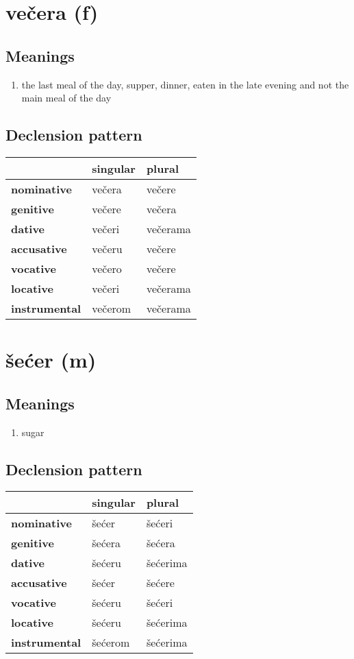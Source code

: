\filbreak
\section{večera (f)}
\subsection*{Meanings}
\begin{enumerate}
\item the last meal of the day, supper, dinner, eaten in the late evening and not the main meal of the day
\end{enumerate}
\subsection*{Declension pattern}
\begin{tabularx}{\linewidth}{Xll}
\toprule
{} & singular &    plural \\
\midrule
\textbf{nominative  } &   večera &    večere \\
\textbf{genitive    } &   večere &    večera \\
\textbf{dative      } &   večeri &  večerama \\
\textbf{accusative  } &   večeru &    večere \\
\textbf{vocative    } &   večero &    večere \\
\textbf{locative    } &   večeri &  večerama \\
\textbf{instrumental} &  večerom &  večerama \\
\bottomrule
\end{tabularx}

\filbreak
\section{šećer (m)}
\subsection*{Meanings}
\begin{enumerate}
\item sugar
\end{enumerate}
\subsection*{Declension pattern}
\begin{tabularx}{\linewidth}{Xll}
\toprule
{} & singular &    plural \\
\midrule
\textbf{nominative  } &    šećer &    šećeri \\
\textbf{genitive    } &   šećera &    šećera \\
\textbf{dative      } &   šećeru &  šećerima \\
\textbf{accusative  } &    šećer &    šećere \\
\textbf{vocative    } &   šećeru &    šećeri \\
\textbf{locative    } &   šećeru &  šećerima \\
\textbf{instrumental} &  šećerom &  šećerima \\
\bottomrule
\end{tabularx}

